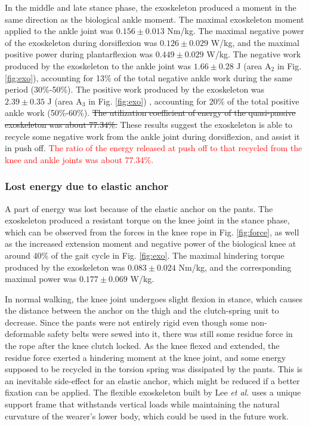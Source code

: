 \documentclass[twocolumn,cleanfoot,10pt]{asme2ej}
\begin{document}
In the middle and late stance phase, the exoskeleton produced a moment in the same direction as the biological ankle moment.
The maximal exoskeleton moment applied to the ankle joint was $0.156\pm0.013$ Nm/kg.
The maximal negative power of the exoskeleton during dorsiflexion was $0.126\pm0.029$ W/kg, and the maximal positive power during plantarflexion was $0.449\pm0.029$ W/kg.
The negative work produced by the exoskeleton to the ankle joint was $1.66\pm0.28$ J (area A$_{2}$ in Fig. \ref{fig:exo}), accounting for 13\% of the total negative ankle work during the same period (30\%-50\%).
The positive work produced by the exoskeleton was $2.39\pm0.35$ J (area A$_{3}$ in Fig. \ref{fig:exo}) , accounting for 20\% of the total positive ankle work (50\%-60\%).
\sout{The utilization coefficient of energy of the quasi-passive exoskeleton was about 77.34\%.}
These results suggest the exoskeleton is able to recycle some negative work from the ankle joint during dorsiflexion, and assist it in push off.
\textcolor{red}{The ratio of the energy released at push off to that recycled from the knee and ankle joints was about 77.34\%.}

\subsubsection{Lost energy due to elastic anchor}
A part of energy was lost because of the elastic anchor on the pants.
The exoskeleton produced a resistant torque on the knee joint in the stance phase, which can be observed from the forces in the knee rope in Fig. \ref{fig:force}, as well as the increased extension moment and negative power of the biological knee at around 40\% of the gait cycle in Fig. \ref{fig:exo}. 
The maximal hindering torque produced by the exoskeleton was $0.083\pm0.024$ Nm/kg, and the corresponding maximal power was $0.177\pm0.069$ W/kg.

In normal walking, the knee joint undergoes slight flexion in stance, which causes the distance between the anchor on the thigh and the clutch-spring unit to decrease.
Since the pants were not entirely rigid even though some non-deformable safety belts were sewed into it, there was still some residue force in the rope after the knee clutch locked.
As the knee flexed and extended, the residue force exerted a hindering moment at the knee joint, and some energy supposed to be recycled in the torsion spring was dissipated by the pants.
This is an inevitable side-effect for an elastic anchor, which might be reduced if a better fixation can be applied.
The flexible exoskeleton built by Lee \emph{et al.} \cite{exosuit} uses a unique support frame that withstands vertical loads while maintaining the natural curvature of the wearer's lower body, which could be used in the future work.
\end{document}
